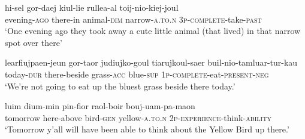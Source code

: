 \documentclass[12]{article}
\begin{document}
\begin{exe}
\ex
\gll hi-sel gor-daej kiul-lie rullea-al toij-nio-kiej-joul \\
 evening-\textsc{ago} there-in animal-\textsc{dim} narrow-\textsc{a.to.n} \textsc{3p}-\textsc{complete}-take-\textsc{past} \\
`One evening ago they took away a cute little animal (that lived) in that narrow spot over there'
\end{exe}


\begin{exe}
\ex 
\gll  learfiujpaen-jeun gor-taor judiujko-goul tiarujkoul-saer buil-nio-tamluar-tur-kau \\
 today-\textsc{dur} there-beside grass-\textsc{acc} blue-\textsc{sup} \textsc{1p}-\textsc{complete}-eat-\textsc{present}-\textsc{neg} \\
 \glt `We're not going to eat up the bluest grass beside there today.' 
\end{exe}

\begin{exe}
\ex
\gll luim dium-min pin-fior raol-boir bouj-uam-pa-maon \\
tomorrow here-above bird-\textsc{gen} yellow-\textsc{a.to.n} \textsc{2p}-\textsc{experience}-think-\textsc{ability} \\
 \glt `Tomorrow y'all will have been able to think about the Yellow Bird up there.'
\end{exe}
\end{document}
